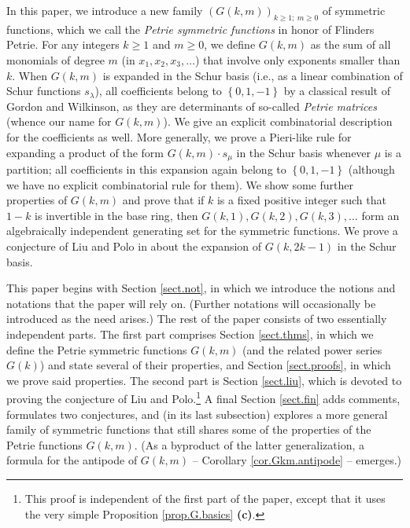 \documentclass[numbers=enddot,12pt,final,onecolumn,notitlepage]{scrartcl}%
\theoremstyle{definition}
\begin{document}
In this paper, we introduce a new family $\left(  G\left(  k,m\right)
\right)  _{k\geq1;\ m\geq0}$ of symmetric functions, which we call the
\textit{Petrie symmetric functions} in honor of Flinders Petrie. For any
integers $k\geq1$ and $m\geq0$, we define $G\left(  k,m\right)  $ as the sum
of all monomials of degree $m$ (in $x_{1},x_{2},x_{3},\ldots$) that involve
only exponents smaller than $k$. When $G\left(  k,m\right)  $ is expanded in
the Schur basis (i.e., as a linear combination of Schur functions $s_{\lambda
}$), all coefficients belong to $\left\{  0,1,-1\right\}  $ by a classical
result of Gordon and Wilkinson, as they are determinants of so-called
\textit{Petrie matrices} (whence our name for $G\left(  k,m\right)  $). We
give an explicit combinatorial description for the coefficients as well. More
generally, we prove a Pieri-like rule for expanding a product of the form
$G\left(  k,m\right)  \cdot s_{\mu}$ in the Schur basis whenever $\mu$ is a
partition; all coefficients in this expansion again belong to $\left\{
0,1,-1\right\}  $ (although we have no explicit combinatorial rule for them).
We show some further properties of $G\left(  k,m\right)  $ and prove that if
$k$ is a fixed positive integer such that $1-k$ is invertible in the base
ring, then $G\left(  k,1\right)  ,G\left(  k,2\right)  ,G\left(  k,3\right)
,\ldots$ form an algebraically independent generating set for the symmetric
functions. We prove a conjecture of Liu and Polo in \cite[Remark
1.4.5]{LiuPol19} about the expansion of $G\left(  k,2k-1\right)  $ in the
Schur basis.

This paper begins with Section \ref{sect.not}, in which we introduce the
notions and notations that the paper will rely on. (Further notations will
occasionally be introduced as the need arises.) The rest of the paper consists
of two essentially independent parts. The first part comprises Section
\ref{sect.thms}, in which we define the Petrie symmetric functions $G\left(
k,m\right)  $ (and the related power series $G\left(  k\right)  $) and state
several of their properties, and Section \ref{sect.proofs}, in which we prove
said properties. The second part is Section \ref{sect.liu}, which is devoted
to proving the conjecture of Liu and Polo.\footnote{This proof is independent
of the first part of the paper, except that it uses the very simple
Proposition \ref{prop.G.basics} \textbf{(c)}.} A final Section \ref{sect.fin}
adds comments, formulates two conjectures, and (in its last subsection)
explores a more general family of symmetric functions that still shares some
of the properties of the Petrie functions $G\left(  k,m\right)  $. (As a
byproduct of the latter generalization, a formula for the antipode of
$G\left(  k,m\right)  $ -- Corollary \ref{cor.Gkm.antipode} -- emerges.)
\end{document}
